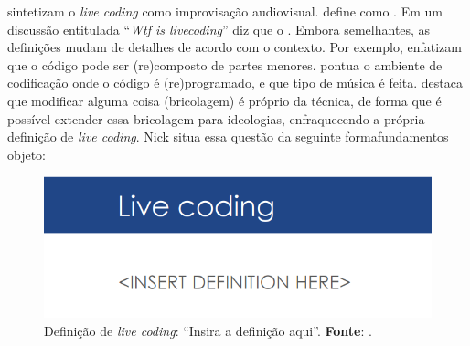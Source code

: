  sintetizam o \emph{live coding} como improvisação audiovisual.  define como . Em um discussão entitulada ``\emph{Wtf is livecoding}'' diz que o  . Embora semelhantes, as definições mudam de detalhes de acordo com o contexto. Por exemplo,  enfatizam que o código pode ser (re)composto de partes menores.  pontua o ambiente de codificação onde o código é (re)programado, e que tipo de música é feita.  destaca que modificar alguma coisa (bricolagem) é próprio da técnica, de forma que é possível extender essa bricolagem para ideologias, enfraquecendo a própria definição de \emph{live coding}. Nick  situa essa questão da seguinte formafundamentos objeto:

  \begin{figure}[h]
    \centering
    \includegraphics[scale=0.7]{imagens/live_coding_def.png}
    \caption{Definição de \emph{live coding}: ``Insira a definição aqui''. \textbf{Fonte}: .}
    \label{fig:live_coding_def}
  \end{figure}


